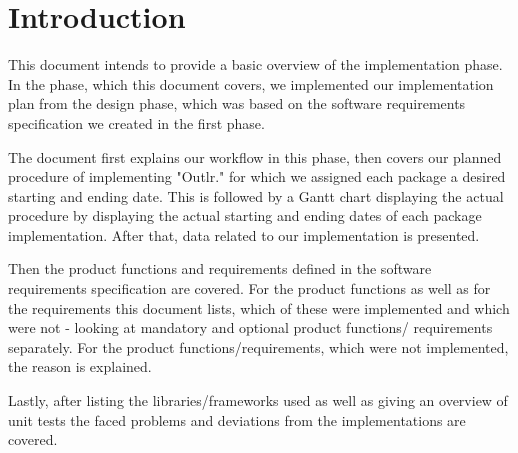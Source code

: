 \section{Introduction}
This document intends to provide a basic overview of the implementation phase. In the phase, which this document covers, we implemented our implementation plan from the design phase, which was based on the software requirements specification we created in the first phase. 

The document first explains our workflow in this phase, then covers our planned procedure of implementing "Outlr." for which we assigned each package a desired starting and ending date. This is followed by a Gantt chart displaying the actual procedure by displaying the actual starting and ending dates of each package implementation.
After that, data related to our implementation is presented.

Then the product functions and requirements defined in the software requirements specification are covered. For the product functions as well as for the requirements this document lists, which of these were implemented and which were not - looking at mandatory and optional product functions/ requirements separately. For the product functions/requirements, which were not implemented, the reason is explained. 

Lastly, after listing the libraries/frameworks used as well as giving an overview of unit tests the faced problems and deviations from the implementations are covered. 

\newpage